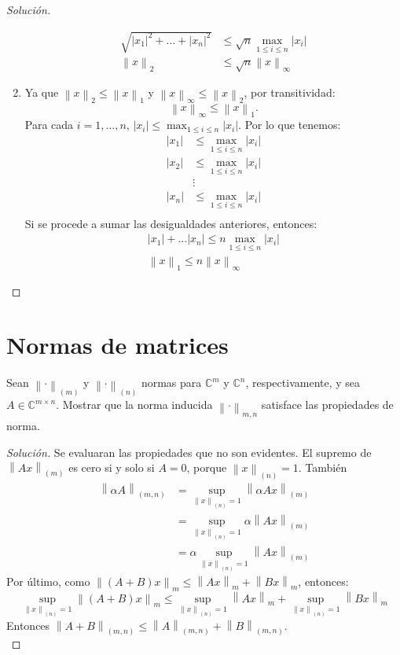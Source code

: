 \documentclass[12pt]{book}
\newcommand{\C}{\mathbb{C}}
\newcommand\norm[1]{\left\lVert#1\right\rVert}
\newcommand\abs[1]{\left\lvert#1\right\rvert}
\newenvironment{solucion}
  {\renewcommand\qedsymbol{$\square$}\begin{proof}[Solución]}
  {\end{proof}}
\begin{document}
\begin{solucion}
\begin{enumerate}
\begin{align*}
        \sqrt{\abs{x_1}^2+\dots+\abs{x_n}^2}&\leq \sqrt{n}\max_{1\leq i\leq n}\abs{x_i}\\
        \norm{x}_2&\leq\sqrt{n}\norm{x}_\infty
    \end{align*}
    \item Ya que $\norm{x}_2\leq\norm{x}_1$ y $\norm{x}_\infty\leq\norm{x}_2$, por transitividad:
    \[
        \norm{x}_\infty\leq\norm{x}_1.
    \]
    Para cada $i=1,\dots,n$, $\abs{x_i}\leq\max_{1\leq i\leq n}\abs{x_i}$. Por lo que tenemos:
    \begin{align*}
    \abs{x_1}&\leq\max_{1\leq i\leq n}\abs{x_i}\\
    \abs{x_2}&\leq\max_{1\leq i\leq n}\abs{x_i}\\
    &\vdots\\
    \abs{x_n}&\leq\max_{1\leq i\leq n}\abs{x_i}\\
    \end{align*}
    Si se procede a sumar las desigualdades anteriores, entonces:
    \begin{align*}
        \abs{x_1}+\dots\abs{x_n}\leq n\max_{1\leq i\leq n}\abs{x_i}\\
        \norm{x}_1\leq n\norm{x}_\infty
    \end{align*}
\end{enumerate}
\end{solucion}
\section{Normas de matrices}
\eje Sean $\norm{\cdot}_{(m)}$ y $\norm{\cdot}_{(n)}$ normas para $\C^m$ y $\C^n$, respectivamente, y sea $A\in\C^{m\times n}$. Mostrar que la norma inducida $\norm{\cdot}_{m,n}$ satisface las propiedades de norma.
\begin{solucion}
Se evaluaran las propiedades que no son evidentes. El supremo de $\norm{Ax}_{(m)}$ es cero si y solo si $A=0$, porque $\norm{x}_{(n)}=1$. También 
\begin{align*}
    \norm{\alpha A}_{(m,n)}&=\sup_{\norm{x}_{(n)}=1}\norm{\alpha Ax}_{(m)}\\
    &=\sup_{\norm{x}_{(n)}=1}\alpha\norm{ Ax}_{(m)}\\
    &=\alpha\sup_{\norm{x}_{(n)}=1}\norm{ Ax}_{(m)}
\end{align*}
Por último, como $\norm{(A+B)x}_{m}\leq\norm{Ax}_{m}+\norm{Bx}_{m}$, entonces:
\[\sup_{\norm{x}_{(n)}=1}\norm{(A+B)x}_{m}\leq\sup_{\norm{x}_{(n)}=1}\norm{Ax}_{m}+\sup_{\norm{x}_{(n)}=1}\norm{Bx}_{m}\]
Entonces $\norm{A+B}_{(m,n)}\leq\norm{A}_{(m,n)}+\norm{B}_{(m,n)}$.\\
\end{solucion}
\end{document}
